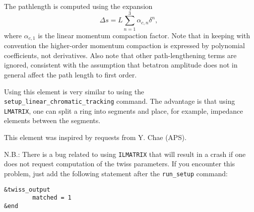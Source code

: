 The pathlength is computed using the expansion
\begin{equation}
\Delta s = L\sum_{n=1}^3 \alpha_{c,n} \delta^n,
\end{equation}
where $\alpha_{c,1}$ is the linear momentum compaction factor.
Note that in keeping with convention the higher-order momentum compaction is expressed
by polynomial coefficients, not derivatives.
Also note that other path-lengthening terms are ignored, consistent with the assumption
that betatron amplitude does not in general affect the path length to first order.

Using this element is very similar to using the \verb|setup_linear_chromatic_tracking| command.
The advantage is that using {\tt LMATRIX}, one can split a ring into segments
and place, for example, impedance elements between the segments.

This element was inspired by requests from Y. Chae (APS).

N.B.: There is a bug related to using {\tt ILMATRIX} that will result in a crash
if one does not request computation of the twiss parameters. If you encounter this
problem, just add the following statement after the \verb|run_setup| command:
\begin{verbatim}
&twiss_output
        matched = 1
&end
\end{verbatim}

